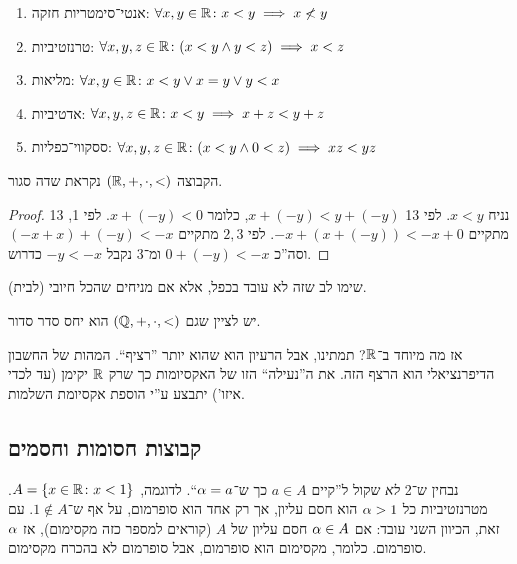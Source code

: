\documentclass[name=רשימות חשבון דיפרנציאלי ואינטגרלי 1א]{../../../tex/classes/megasumPreamble}
\begin{document}
	\begin{enumerate}
		\item אנטי־סימטריות חזקה: \hfill $\forall x, y \in \mathbb{R} \colon x < y \implies x \not< y$
		\item טרנזטיביות: \hfill $\forall x, y, z \in \mathbb{R} \colon (x < y \land y < z) \implies x < z$
		\item מליאות: \hfill $\forall x, y \in \mathbb{R} \colon x < y \lor x = y \lor y < x$
		\item אדטיביות: \hfill $\forall x, y, z \in \mathbb{R} \colon x < y \implies x + z < y+ z$
		\item ססקווי־כפליות: \hfill $\forall x, y, z \in \mathbb{R}\colon (x < y \land 0 < z) \implies xz < yz$
	\end{enumerate}

	הקבוצה $(\mathbb{R}, +, \cdot, <)$ נקראת שדה סגור.
	\begin{proof}
		נניח $x < y$. לפי 13 $x + (-y) < y + (-y)$, כלומר $x + (-y) < 0$. לפי 1, 13 מתקיים $-x + (x + (-y)) < -x + 0$. לפי $2, 3$ מתקיים $(-x + x) + (-y) < -x$ וסה''כ $0 + (-y) < -x$ ומ־$3$ נקבל $-y < -x$ כדרוש.
	\end{proof}

	שימו לב שזה לא עובד בכפל, אלא אם מניחים שהכל חיובי (לבית).

	יש לציין שגם $(\mathbb{Q}, +, \cdot, <)$ הוא יחס סדר סדור.

	אז מה מיוחד ב־$\mathbb{R}$? תמתינו, אבל הרעיון הוא שהוא יותר ''רציף``. המהות של החשבון הדיפרנציאלי הוא הרצף הזה. את ה''נעילה`` הזו של האקסיומות כך שרק $\mathbb{R}$ יקימן (עד לכדי איזו') יתבצע ע''י הוספת אקסיומת השלמות.

	\subsection{קבוצות חסומות וחסמים}
	נבחין ש־2 \textit{לא} שקול ל''קיים $a\in A$ כך ש־$\alpha = a$``. לדוגמה, $A = \{x \in \mathbb{R}\colon x < 1\}$. מטרנזטיביות כל $\alpha > 1$ הוא חסם עליון, אך רק אחד הוא סופרמום, על אף ש־$1 \notin A$. עם זאת, הכיוון השני עובד: אם $\alpha \in A$ חסם עליון של $A$ (קוראים למספר כזה מקסימום), אז $\alpha$ סופרמום. כלומר, מקסימום הוא סופרמום, אבל סופרמום לא בהכרח מקסימום.
\end{document}
